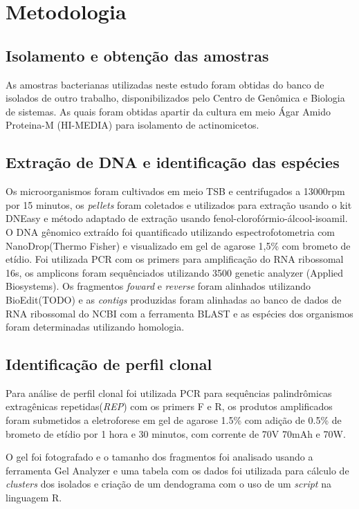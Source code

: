 \section{Metodologia}
\subsection{Isolamento e obtenção das amostras}
As amostras bacterianas utilizadas neste estudo foram obtidas do banco de isolados de outro
trabalho, disponibilizados pelo Centro de Genômica e Biologia de sistemas. As quais foram
obtidas apartir da cultura em meio Ágar Amido Proteina-M (HI-MEDIA) para isolamento de actinomicetos.

\subsection{Extração de DNA e identificação das espécies}
Os microorganismos foram cultivados em meio TSB e centrifugados a 13000rpm por 15 minutos,
os \textit{pellets} foram coletados e utilizados para extração usando o kit DNEasy e método
adaptado de extração usando  fenol-clorofórmio-álcool-isoamil. O DNA gênomico extraído
foi quantificado utilizando espectrofotometria com NanoDrop(Thermo Fisher) e visualizado
em gel de agarose 1,5\% com brometo de etídio. 
Foi utilizada PCR com os primers %
para amplificação do RNA ribossomal 16s, os amplicons foram sequênciados utilizando 3500 
genetic analyzer (Applied Biosystems). Os fragmentos \textit{foward} e \textit{reverse}
foram alinhados utilizando BioEdit(TODO) e as \textit{contigs} produzidas foram
alinhadas ao banco de dados de RNA ribossomal do NCBI com a ferramenta BLAST e as espécies
dos organismos foram determinadas utilizando homologia.  

\subsection{Identificação de perfil clonal}
Para análise de perfil clonal foi utilizada PCR para sequências palindrômicas
extragênicas repetidas(\textit{REP}) com os primers F e R, os produtos amplificados
foram submetidos a eletroforese em gel de agarose 1.5\% com adição de 0.5\% de
brometo de etídio por 1 hora e 30 minutos, com corrente de 70V 70mAh e 70W.

O gel foi fotografado e o tamanho dos fragmentos foi analisado usando a ferramenta
Gel Analyzer e uma tabela com os dados foi utilizada para cálculo de \textit{clusters}
dos isolados e criação de um dendograma com o uso de um \textit{script} na
linguagem R.

